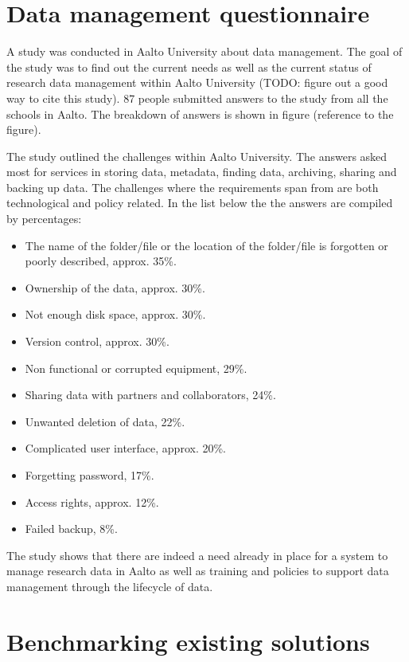 \section{Data management questionnaire}
\label{sec:questionnaire}

A study was conducted in Aalto University about data management. The goal of
the study was to find out the current needs as well as the current status of
research data management within Aalto University (TODO: figure out a good way
to cite this study). 87 people submitted answers to the study from all the
schools in Aalto. The breakdown of answers is shown in figure (reference to the
figure).

The study outlined the challenges within Aalto University. The answers asked
most for services in storing data, metadata, finding data, archiving, sharing
and backing up data. The challenges where the requirements span from are both
technological and policy related. In the list below the the answers are
compiled by percentages:

\begin{itemize}
    \item The name of the folder/file or the location of the folder/file is
          forgotten or poorly described, approx. 35\%.
    \item Ownership of the data, approx. 30\%.
    \item Not enough disk space, approx. 30\%.
    \item Version control, approx. 30\%.
    \item Non functional or corrupted equipment, 29\%.
    \item Sharing data with partners and collaborators, 24\%.
    \item Unwanted deletion of data, 22\%.
    \item Complicated user interface, approx. 20\%.
    \item Forgetting password, 17\%.
    \item Access rights, approx. 12\%.
    \item Failed backup, 8\%.
\end{itemize}

The study shows that there are indeed a need already in place for a system to
manage research data in Aalto as well as training and policies to support data
management through the lifecycle of data.

\section{Benchmarking existing solutions}
\label{sec:benchmarking}

